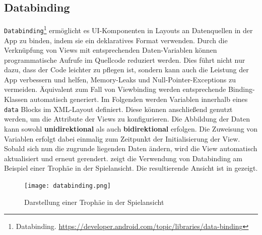 \subsection{Databinding}\label{subsec:databinding}

\texttt{Databinding}\footnote{Databinding. \url{https://developer.android.com/topic/libraries/data-binding}} ermöglicht es UI-Komponenten in Layouts an Datenquellen in der App zu binden, indem sie ein deklaratives Format verwenden. Durch die Verknüpfung von Views mit entsprechenden Daten-Variablen können programmatische Aufrufe im Quellcode reduziert werden. Dies führt nicht nur dazu, dass der Code leichter zu pflegen ist, sondern kann auch die Leistung der App verbessern und helfen, Memory-Leaks und Null-Pointer-Exceptions zu vermeiden. Äquivalent zum Fall von Viewbinding werden entsprechende Binding-Klassen automatisch generiert. Im Folgenden werden Variablen innerhalb eines \texttt{data} Blocks im XML-Layout definiert. Diese können anschließend genutzt werden, um die Attribute der Views zu konfigurieren. Die Abbildung der Daten kann sowohl \textbf{unidirektional} als auch \textbf{bidirektional} erfolgen. Die Zuweisung von Variablen erfolgt dabei einmalig zum Zeitpunkt der Initialisierung der View. Sobald sich nun die zugrunde liegenden Daten ändern, wird die View automatisch aktualisiert und erneut gerendert.  zeigt die Verwendung von Databinding am Beispiel einer Trophäe in der Spielansicht. Die resultierende Ansicht ist in  gezeigt.

\begin{figure}[H]
    \texttt{[image: databinding.png]}
    \caption{Darstellung einer Trophäe in der Spielansicht}\label{fig:databinding}
\end{figure}

